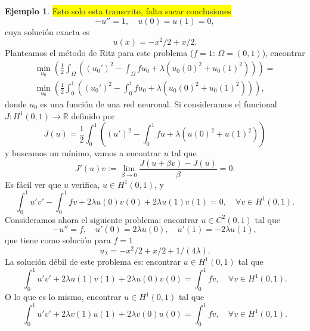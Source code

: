 \documentclass[a4paper,11pt,spanish, twoside, leqno]{tfg-uam}
\theoremstyle{definition}
\newtheorem{exmp}[teor]{Ejemplo}
\begin{document}
\begin{mdframed}
\begin{exmp}
    \colorbox{yellow}{Esto solo esta transcrito, falta sacar conclusiones}
    \begin{equation*}
    -u'' = 1, \quad u(0) = u(1) = 0,
    \end{equation*}
    cuya solución exacta es 
    \begin{equation*}
    u(x) = -x^2/2 + x/2.
    \end{equation*}
    Planteamos el método de Ritz para este problema (\(f = 1\): \(\Omega = (0,1)\)),
    encontrar 
    \begin{align*}
    \min_{u_0} \left( \frac{1}{2} \int_\Omega \left((u_0')^2 - \int_\Omega fu_0 + \lambda (u_0(0)^2 + u_0(1)^2)\right)\right) =\\
    \min_{u_0} \left(\frac{1}{2} \int_0^1 \left((u_0')^2 - \int_0^1 fu_0 + \lambda (u_0(0)^2 + u_0(1)^2)\right)\right),
    \end{align*}
    donde \(u_0\) es una función de una red neuronal.
    Si consideramos el funcional \(J: H^1(0,1) \to \mathbb{R}\) definido por 
    \begin{equation*}
    J(u) = \frac{1}{2} \int_0^1 \left((u')^2 - \int_0^1 fu + \lambda (u(0)^2 + u(1)^2)\right)
    \end{equation*}
    y buscamos un mínimo, vamos a encontrar \(u\) tal que
    \begin{equation*}
    J'(u)v := \lim_{\beta \to 0} \frac{J(u + \beta v) - J(u)}{\beta} = 0.
    \end{equation*}
    Es fácil ver que \(u\) verifica, \(u \in H^1(0,1)\), y 
    \begin{equation*}
    \int_0^1 u'v' - \int_0^1 fv + 2\lambda u(0)v(0) + 2\lambda u(1)v(1) = 0, \quad \forall v \in H^1(0,1).
    \end{equation*}
    Consideramos ahora el siguiente problema: encontrar \(u \in C^2(0,1)\) tal que 
    \begin{equation*}
    -u'' = f, \quad u'(0) = 2\lambda u(0), \quad u'(1) = -2\lambda u(1),
    \end{equation*}
    que tiene como solución para \(f = 1\)
    \begin{equation*}
    u_\lambda = -x^2/2 + x/2 + 1/(4\lambda).
    \end{equation*}
    La solución débil de este problema es: encontrar \(u \in H^1(0,1)\) tal que 
    \begin{equation*}
    \int_0^1 u'v' + 2\lambda u(1)v(1) + 2\lambda u(0)v(0) = \int_0^1 fv, \quad \forall v \in H^1(0,1).
    \end{equation*}
    O lo que es lo mismo, encontrar \(u \in H^1(0,1)\) tal que 
    \begin{equation*}
    \int_0^1 u'v' + 2\lambda v(1)u(1) + 2\lambda v(0)u(0) = \int_0^1 fv, \quad \forall v \in H^1(0,1).
    \end{equation*}
\end{exmp}
\end{mdframed}
\end{document}
